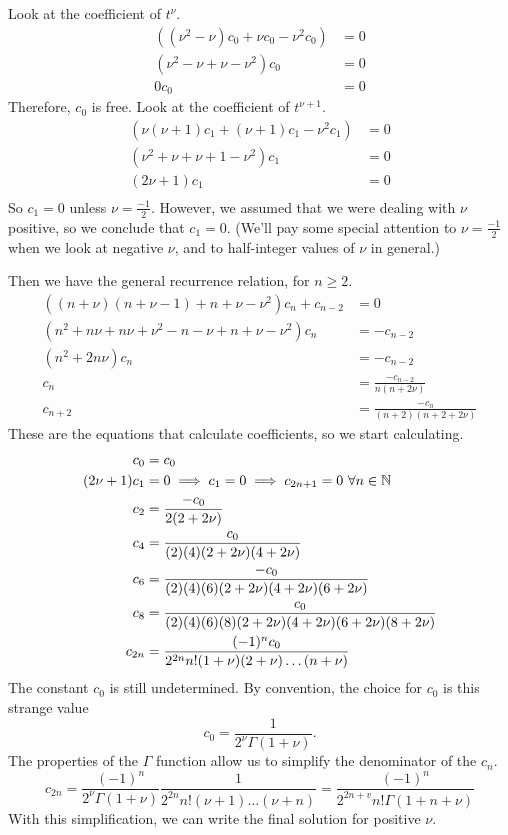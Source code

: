 \documentclass[fleqn,letterpaper]{report}
\begin{document}
Look at the coefficient of $t^{\nu}$.
\begin{align*}
\left( (\nu^2 - \nu) c_0 +\nu c_0 - \nu^2 c_0 \right) & = 0 \\
\left( \nu^2 - \nu + \nu - \nu^2 \right) c_0 & = 0 \\
0 c_0 & = 0 
\end{align*}
Therefore, $c_0$ is free. Look at the coefficient of
$t^{\nu+1}$.
\begin{align*}
\left( \nu(\nu+1)c_1 + (\nu+1) c_1 - \nu^2 c_1 \right) & = 0 \\
\left( \nu^2 + \nu + \nu + 1 - \nu^2 \right) c_1 & = 0 \\
\left( 2 \nu + 1 \right) c_1 & =0 \\
\end{align*}
So $c_1 = 0$ unless $\nu = \frac{-1}{2}$. However, we assumed
that we were dealing with $\nu$ positive, so we conclude that
$c_1 = 0$. (We'll pay some special attention to $\nu =
\frac{-1}{2}$ when we look at negative $\nu$, and to
half-integer values of $\nu$ in general.)

Then we have the general recurrence relation, for $n \geq 2$.
\begin{align*}
((n+\nu)(n+\nu-1) + n + \nu - \nu^2) c_n + c_{n-2} & = 0 \\
(n^2 + n\nu + n\nu + \nu^2 - n - \nu + n + \nu - \nu^2 ) c_n &
= -c_{n-2} \\
(n^2 + 2n\nu) c_n & = -c_{n-2} \\
c_n & = \frac{-c_{n-2}}{n(n+2\nu)} \\
c_{n+2} & = \frac{-c_n}{(n+2)(n+2+2\nu)} 
\end{align*}
These are the equations that calculate coefficients, so we
start calculating. 
\begin{align*}
c_0 & = c_0 \\
(2\nu+1) c_1 & = 0 \implies c_1 = 0 \implies c_{2n+1} = 0 \
\forall n \in \mathbb{N} \\
c_2 & = \frac{-c_0}{2(2+2\nu)} \\
c_4 & = \frac{c_0}{(2)(4)(2+2\nu)(4+2\nu)} \\
c_6 & = \frac{-c_0}{(2)(4)(6)(2+2\nu)(4+2\nu)(6+2\nu)} \\
c_8 & = \frac{c_0}{(2)(4)(6)(8)(2+2\nu)(4+2\nu)(6+2\nu)
(8+2\nu)} \\
c_{2n} & = \frac{(-1)^n c_0}{2^{2n} n! (1+\nu)(2+\nu) \ldots
(n+\nu)}
\end{align*}
The constant $c_0$ is still undetermined. By convention, the
choice for $c_0$ is this strange value
\begin{equation*}
c_0 = \frac{1}{2^\nu \Gamma(1+\nu)}.
\end{equation*}
The properties of the $\Gamma$ function allow us to simplify the
denominator of the $c_n$.
\begin{equation*}
c_{2n} = \frac{(-1)^n}{2^\nu \Gamma(1+\nu)} \frac{1}{2^{2n}n!
(\nu+1) \ldots (\nu+n)} = \frac{(-1)^n}{2^{2n+v} n!
\Gamma(1+n+\nu)} 
\end{equation*}
With this simplification, we can write the final solution for
positive $\nu$. 
\end{document}
